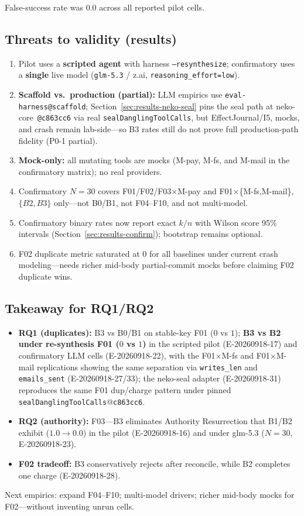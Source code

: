 \documentclass[11pt,a4paper]{article}
\begin{document}
False-success rate was $0.0$ across all reported pilot cells.

\subsection{Threats to validity (results)}

\begin{enumerate}
\item Pilot uses a \textbf{scripted agent} with harness
  \texttt{--resynthesize}; confirmatory uses a \textbf{single} live model
  (\texttt{glm-5.3} / z.ai, \texttt{reasoning\_effort=low}).
\item \textbf{Scaffold vs.\ production (partial):} LLM empirics use
  \texttt{eval-harness@scaffold}; Section~\ref{sec:results-neko-seal} pins
  the seal path at neko-core~\texttt{@c863cc6} via real
  \texttt{sealDanglingToolCalls}, but EffectJournal/I5, mocks, and crash
  remain lab-side---so B3 rates still do not prove full production-path
  fidelity (P0-1 partial).
\item \textbf{Mock-only:} all mutating tools are mocks (M-pay, M-fs, and M-mail
  in the confirmatory matrix); no real providers.
\item Confirmatory $N{=}30$ covers F01/F02/F03$\times$M-pay and
  F01$\times$\{M-fs,M-mail\}, $\{B2,B3\}$ only---not B0/B1, not
  F04--F10, and not multi-model.
\item Confirmatory binary rates now report exact $k/n$ with Wilson score
  95\% intervals (Section~\ref{sec:results-confirm}); bootstrap remains
  optional.
\item F02 duplicate metric saturated at $0$ for all baselines under current
  crash modeling---needs richer mid-body partial-commit mocks before
  claiming F02 duplicate wins.
\end{enumerate}

\subsection{Takeaway for RQ1/RQ2}

\begin{itemize}
\item \textbf{RQ1 (duplicates):} B3 vs B0/B1 on stable-key F01 ($0$ vs $1$);
  \textbf{B3 vs B2 under re-synthesis F01 ($0$ vs $1$)} in the scripted
  pilot (E-20260918-17) and confirmatory LLM cells (E-20260918-22), with
  the F01$\times$M-fs and F01$\times$M-mail replications showing the same
  separation via \texttt{writes\_len} and \texttt{emails\_sent}
  (E-20260918-27/33); the neko-seal adapter
  (E-20260918-31) reproduces the same F01 dup/charge pattern under pinned
  \texttt{sealDanglingToolCalls}@\texttt{c863cc6}.
\item \textbf{RQ2 (authority):} F03---B3 eliminates Authority Resurrection
  that B1/B2 exhibit ($1.0 \to 0.0$) in the pilot (E-20260918-16) and
  under glm-5.3 ($N{=}30$, E-20260918-23).
\item \textbf{F02 tradeoff:} B3 conservatively rejects after reconcile,
  while B2 completes one charge (E-20260918-28).
\end{itemize}
Next empirics: expand F04--F10; multi-model drivers; richer mid-body mocks
for F02---without inventing unrun cells.
\end{document}
